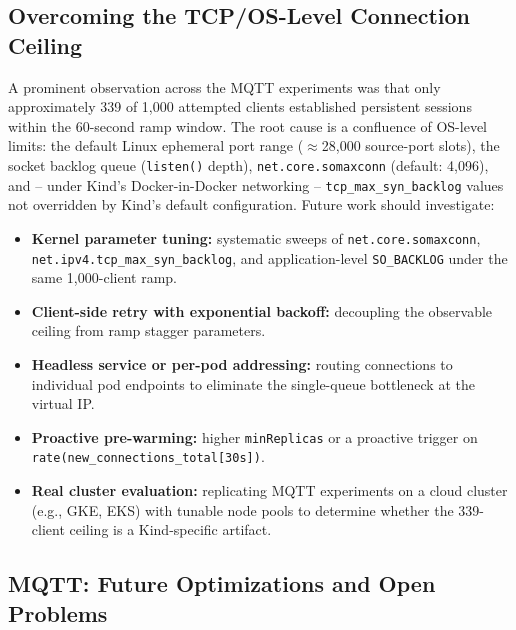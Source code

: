 \documentclass[twocolumn]{svjour3}
\begin{document}
\subsection{Overcoming the TCP/OS-Level Connection Ceiling}

A prominent observation across the MQTT experiments was that only approximately 339 of
1{,}000 attempted clients established persistent sessions within the 60-second ramp window.
The root cause is a confluence of OS-level limits: the default Linux ephemeral port range
($\approx$28{,}000 source-port slots), the socket backlog queue (\texttt{listen()} depth),
\texttt{net.core.somaxconn} (default: 4{,}096), and -- under Kind's Docker-in-Docker
networking -- \texttt{tcp\_max\_syn\_backlog} values not overridden by Kind's default
configuration. Future work should investigate:

\begin{itemize}[leftmargin=*]
  \item \textbf{Kernel parameter tuning:} systematic sweeps of \texttt{net.core.somaxconn},
    \texttt{net.ipv4.tcp\_max\_syn\_backlog}, and application-level \texttt{SO\_BACKLOG} under
    the same 1{,}000-client ramp.
  \item \textbf{Client-side retry with exponential backoff:} decoupling the observable ceiling
    from ramp stagger parameters.
  \item \textbf{Headless service or per-pod addressing:} routing connections to individual pod
    endpoints to eliminate the single-queue bottleneck at the virtual IP.
  \item \textbf{Proactive pre-warming:} higher \texttt{minReplicas} or a proactive trigger on
    \texttt{rate(new\_connections\_total[30s])}.
  \item \textbf{Real cluster evaluation:} replicating MQTT experiments on a cloud cluster
    (e.g., GKE, EKS) with tunable node pools to determine whether the 339-client ceiling is a
    Kind-specific artifact.
\end{itemize}

\subsection{MQTT: Future Optimizations and Open Problems}
\end{document}
